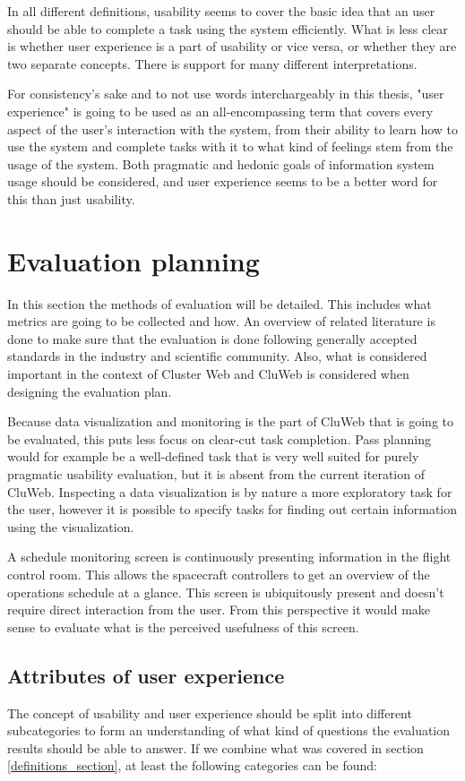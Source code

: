 In all different definitions, usability seems to cover the basic idea that an user should be able to complete a task using the system efficiently. What is less clear is whether user experience is a part of usability or vice versa, or whether they are two separate concepts. There is support for many different interpretations.

For consistency's sake and  to not use words interchargeably in this thesis, "user experience" is going to be used as an all-encompassing term that covers every aspect of the user's interaction with the system, from their ability to learn how to use the system and complete tasks with it to what kind of feelings stem from the usage of the system. Both pragmatic and hedonic goals of information system usage should be considered, and user experience seems to be a better word for this than just usability.

\section{Evaluation planning}
In this section the methods of evaluation will be detailed. This includes what metrics are going to be collected and how. An overview of related literature is done to make sure that the evaluation is done following generally accepted standards in the industry and scientific community. Also, what is considered important in the context of Cluster Web and CluWeb is considered when designing the evaluation plan.

Because data visualization and monitoring is the part of CluWeb that is going to be evaluated, this puts less focus on clear-cut task completion. Pass planning would for example be a well-defined task that is very well suited for purely pragmatic usability evaluation, but it is absent from the current iteration of CluWeb. Inspecting a data visualization is by nature a more exploratory task for the user, however it is possible to specify tasks for finding out certain information using the visualization.

A schedule monitoring screen is continuously presenting information in the flight control room. This allows the spacecraft controllers to get an overview of the operations schedule at a glance. This screen is ubiquitously present and doesn't require direct interaction from the user. From this perspective it would make sense to evaluate what is the perceived usefulness of this screen.

\subsection{Attributes of user experience}\label{usability_attributes}
The concept of usability and user experience should be split into different subcategories to form an understanding of what kind of questions the evaluation results should be able to answer. If we combine what was covered in section \ref{definitions_section}, at least the following categories can be found:

